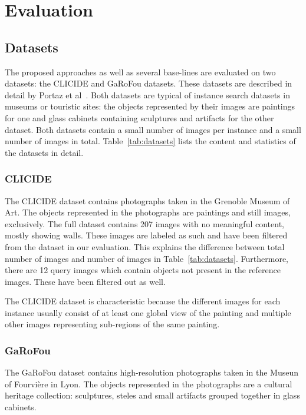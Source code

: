 
\chapter{Evaluation}\label{sec:evaluation}
\section{Datasets}\label{sec:datasets}
The proposed approaches as well as several base-lines are evaluated
on two datasets: the CLICIDE and GaRoFou datasets. These datasets are
described in detail by Portaz et al~\cite{portaz_construction_nodate}.
Both datasets are typical of instance search datasets
in museums or touristic sites: the objects represented by their images
are paintings for one and glass cabinets containing sculptures and artifacts
for the other dataset. Both datasets contain a small number of images
per instance and a small number of images in total.
Table~\ref{tab:datasets} lists the content and statistics of the datasets
in detail.

\subsection{CLICIDE}
The CLICIDE dataset contains photographs taken in the Grenoble Museum of Art.
The objects represented in the photographs are paintings and still images,
exclusively. The full dataset contains 207 images with no meaningful content,
mostly showing walls. These images are labeled as such and have been filtered
from the dataset in our evaluation. This explains the difference between
total number of images and number of images in Table~\ref{tab:datasets}.
Furthermore, there are 12 query images which contain objects not
present in the reference images. These have been filtered out as well.

The CLICIDE dataset is characteristic because the different images
for each instance usually consist of at least one global view of the
painting and multiple other images representing sub-regions of the
same painting.

\subsection{GaRoFou}
The GaRoFou dataset contains high-resolution photographs taken in the
Museun of Fourvière in Lyon. The objects represented in the photographs
are a cultural heritage collection: sculptures, steles and small artifacts
grouped together in glass cabinets.

